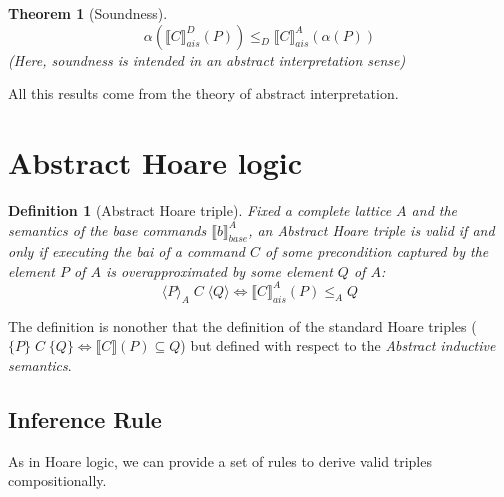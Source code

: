 \documentclass{article}
\newtheorem{definition}{Definition}
\newtheorem{theorem}{Theorem}
\newcommand{\htriple}[3]{
    \{ #1 \} \; #2 \; \{ #3 \}
}
\newcommand{\atriple}[4][A]{
    \langle #2 \rangle_#1 \; #3 \; \langle #4 \rangle
}
\newcommand*{\sem}[1]{
    \llbracket #1 \rrbracket
}
\newcommand{\bca}[2]{
    #2_{ais}^{#1}
}
\newcommand{\bsem}[2][A]{
    \bca{#1}{\sem{#2}}
}
\newcommand{\basesem}[2][A]{
    \sem{#2}_{base}
}
\begin{document}
\begin{theorem}[Soundness]
    $$\alpha(\bsem[D]{C}(P)) \leq_D \bsem[A]{C}(\alpha(P))$$
    (Here, soundness is intended in an abstract interpretation sense)
\end{theorem}

All this results come from the theory of abstract interpretation.

\section{Abstract Hoare logic}
    

    \begin{definition}[Abstract Hoare triple]
        Fixed a complete lattice $A$ and the semantics of the base commands 
        $\basesem{b}^A$, an \textit{Abstract Hoare triple} is valid if and only if 
        executing the bai of a command $C$ of some precondition captured by the
        element $P$ of $A$ is overapproximated by some element $Q$ of $A$:
        $$\atriple{P}{C}{Q} \iff \bsem{C}(P) \leq_A Q$$
    \end{definition}

    The definition is nonother that the definition of the standard Hoare triples
    ($\htriple{P}{C}{Q} \iff \sem{C}(P) \subseteq Q$) but defined with respect
    to the \textit{Abstract inductive semantics}.


    \subsection{Inference Rule}
    As in Hoare logic, we can provide a set of rules to derive valid triples 
    compositionally.
\end{document}
